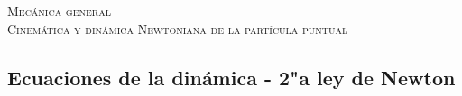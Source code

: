 \documentclass[11pt,spanish,a4paper]{article}
\begin{document}
\begin{center}
  \textsc{\large Mecánica general}\\
  \textsc{\large Cinemática y dinámica Newtoniana de la partícula puntual}
\end{center}

\begin{enumerate}


\section*{Ecuaciones de la dinámica - 2"a ley de Newton}



\end{enumerate}
\end{document}
